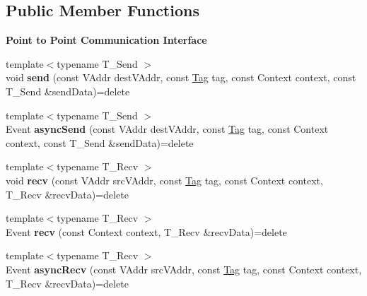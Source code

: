 \subsection*{Public Member Functions}
\begin{Indent}{\bf Point to Point Communication Interface}\par
\begin{DoxyCompactItemize}
\item 
\hypertarget{structgraybat_1_1communicationPolicy_1_1Base_a7c7b3cd367ec07fa9d12ebbbb89dabb8}{}{\footnotesize template$<$typename T\+\_\+\+Send $>$ }\\void {\bfseries send} (const V\+Addr dest\+V\+Addr, const \hyperlink{structTag}{Tag} tag, const Context context, const T\+\_\+\+Send \&send\+Data)=delete\label{structgraybat_1_1communicationPolicy_1_1Base_a7c7b3cd367ec07fa9d12ebbbb89dabb8}

\item 
\hypertarget{structgraybat_1_1communicationPolicy_1_1Base_a7dfe96d75727357e0bbac4f8dad93a55}{}{\footnotesize template$<$typename T\+\_\+\+Send $>$ }\\Event {\bfseries async\+Send} (const V\+Addr dest\+V\+Addr, const \hyperlink{structTag}{Tag} tag, const Context context, const T\+\_\+\+Send \&send\+Data)=delete\label{structgraybat_1_1communicationPolicy_1_1Base_a7dfe96d75727357e0bbac4f8dad93a55}

\item 
\hypertarget{structgraybat_1_1communicationPolicy_1_1Base_a1785dcc6035447fc3c2b1cd9fee9a4b5}{}{\footnotesize template$<$typename T\+\_\+\+Recv $>$ }\\void {\bfseries recv} (const V\+Addr src\+V\+Addr, const \hyperlink{structTag}{Tag} tag, const Context context, T\+\_\+\+Recv \&recv\+Data)=delete\label{structgraybat_1_1communicationPolicy_1_1Base_a1785dcc6035447fc3c2b1cd9fee9a4b5}

\item 
\hypertarget{structgraybat_1_1communicationPolicy_1_1Base_a2c7e5b0d65bfa0fcfa3377598eb79882}{}{\footnotesize template$<$typename T\+\_\+\+Recv $>$ }\\Event {\bfseries recv} (const Context context, T\+\_\+\+Recv \&recv\+Data)=delete\label{structgraybat_1_1communicationPolicy_1_1Base_a2c7e5b0d65bfa0fcfa3377598eb79882}

\item 
\hypertarget{structgraybat_1_1communicationPolicy_1_1Base_adee3935d47f527c2802d3b88b546b0a2}{}{\footnotesize template$<$typename T\+\_\+\+Recv $>$ }\\Event {\bfseries async\+Recv} (const V\+Addr src\+V\+Addr, const \hyperlink{structTag}{Tag} tag, const Context context, T\+\_\+\+Recv \&recv\+Data)=delete\label{structgraybat_1_1communicationPolicy_1_1Base_adee3935d47f527c2802d3b88b546b0a2}

\end{DoxyCompactItemize}
\end{Indent}
